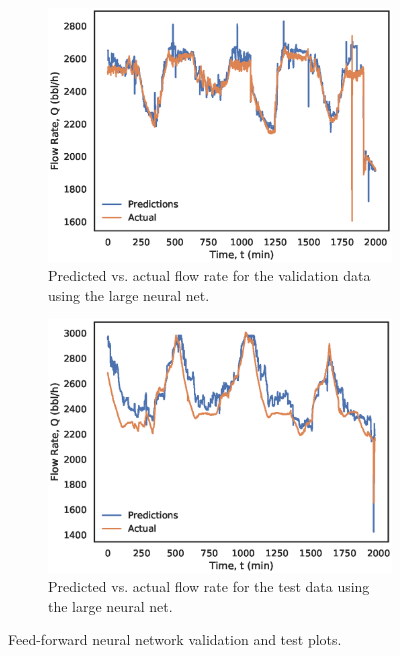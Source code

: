 \begin{figure}[p]
\begin{subfigure}[b]{0.48\textwidth}
         \includegraphics[width=\textwidth]{images/08largenn_valid.eps}
         \caption{Predicted vs. actual flow rate for the validation data using the large neural net.}
         \label{fig:08largenn_valid}
     \end{subfigure}
     \begin{subfigure}[b]{0.48\textwidth}
         \includegraphics[width=\textwidth]{images/08largenn_test.eps}
         \caption{Predicted vs. actual flow rate for the test data using the large neural net.}
         \label{fig:08largenn_test}
     \end{subfigure}
        \caption{Feed-forward neural network validation and test plots.}
        \label{fig:08PolynomialPlots}
\end{figure}


